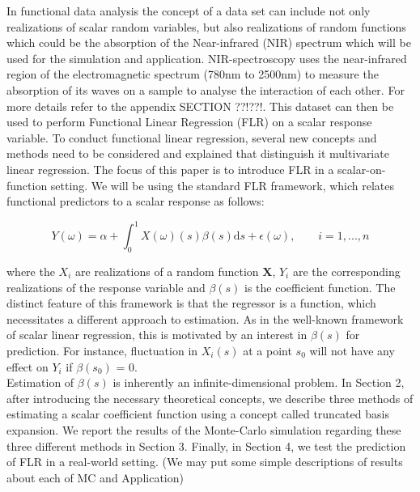 \documentclass[11pt,twoside,a4paper]{article}
\begin{document}
	 In functional data analysis the concept of a data set can include not only realizations of scalar random variables, but also realizations of random functions which could be the absorption of the Near-infrared (NIR) spectrum which will be used for the simulation and application. NIR-spectroscopy uses the near-infrared region of the electromagnetic spectrum (780nm to 2500nm) to measure the absorption of its waves on a sample to analyse the interaction of each other. {\color{green} For more details refer to the appendix SECTION ??!??!}.  This dataset can then be used to perform Functional Linear Regression (FLR) on a scalar response variable. To conduct functional linear regression, several new concepts and methods need to be considered and explained that distinguish it multivariate linear regression.
The focus of this paper is to introduce FLR in a scalar-on-function setting. We will be using the standard FLR framework, which relates functional predictors to a scalar response as follows:
	 
	 \begin{equation}
	 	Y(\omega) = \alpha + \int_{0}^{1}{X(\omega)(s)\beta(s) \mathrm{d}s} + \epsilon(\omega),
	 	\qquad i = 1, ..., n
	 \end{equation}
 
	 where the $X_{i}$ are realizations of a random function $\mathbf{X}$, $Y_i$ are the corresponding realizations of the response variable and $\beta(s)$ is the coefficient function. The distinct feature of this framework is that the regressor is a function, which necessitates a different approach to estimation. As in the well-known framework of scalar linear regression, this is motivated by an interest in $\beta(s)$ for prediction. For instance, fluctuation in $X_i(s)$ at a point $s_0$ will not have any effect on $Y_i$ if $\beta(s_0)$ = 0. \\
	 Estimation of $\beta(s)$ is inherently an infinite-dimensional problem. In Section 2, after introducing the necessary theoretical concepts, we describe three methods of estimating a scalar coefficient function using a concept called truncated basis expansion. We report the results of the Monte-Carlo simulation regarding these three different methods in Section 3. Finally, in Section 4, we test the prediction of FLR in a real-world setting. {\color{red} (We may put some simple descriptions of results about each of MC and Application)}
\end{document}
